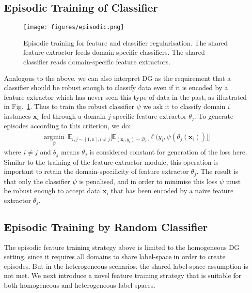 \documentclass[10pt,twocolumn,letterpaper]{article}
\begin{document}
\subsection{Episodic Training of Classifier}
\begin{figure}[t]
\centering
\texttt{[image: figures/episodic.png]}
\vspace{-0.4cm}
\caption{\small Episodic training for feature and classifier regularisation. The shared feature extractor feeds domain specific classifiers. The shared classifier reads domain-specific feature extractors.}
\label{fig-agg-cdt}
    \vspace{-0.3cm}
\end{figure}
Analogous to the above, we can also interpret DG as the requirement that a classifier should be robust enough to classify data even if it is encoded by a feature extractor which has never seen this type of data in the past, as illustrated in Fig.~\ref{fig-agg-cdt}. 
Thus to train the robust classifier $\psi$ we ask it to classify domain $i$ instances $\mathbf{x}_i$ fed through a domain $j$-specific feature extractor $\theta_j$. To generate episodes according to this criterion, we do:
\begin{equation}
\begin{aligned}
\label{eq:agg-reg-clf}
\underset{\psi}{\operatorname{argmin}}~
\mathbb{E}_{i,j\sim[1,n], i\neq j} \big[ \mathbb{E}_{(\mathbf{x}_i,y_i)\sim \mathcal{D}_i} \big[  \ell(y_i, \psi(\overline{\theta}_j(\mathbf{x}_i)) \big] \big]
\end{aligned}
\end{equation}
\noindent where $i\neq j$ and  $\overline{\theta}_j$ means $\theta_j$ is considered constant for generation of the loss here. Similar to the training of the feature extractor module, this operation is important to retain the domain-specificity of feature extractor $\theta_j$. The result is that only the classifier $\psi$ is penalised, and in order to minimise this loss $\psi$ must be robust enough to accept data $\mathbf{x}_i$ that has been encoded by a naive feature extractor $\theta_j$. 



\subsection{Episodic Training by Random Classifier} 

The episodic feature training strategy above is limited to the homogeneous DG setting, since it requires all domains to share  label-space in order to create episodes. But in the heterogeneous scenarios, the shared label-space assumption is not met. We next introduce a novel feature training strategy that is suitable for both homogeneous and heterogeneous label-spaces. 
\end{document}

